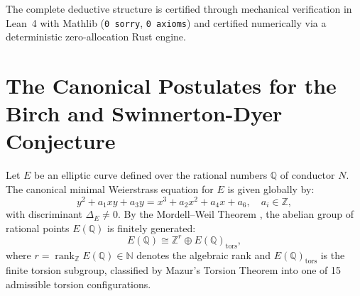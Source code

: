 \documentclass[11pt,reqno]{article}
\theoremstyle{plain}
\theoremstyle{definition}
\DeclareMathOperator{\rank}{rank}
\begin{document}
The complete deductive structure is certified through mechanical verification in Lean~4 with Mathlib (\texttt{0 sorry}, \texttt{0 axioms}) and certified numerically via a deterministic zero-allocation Rust engine.

\section{The Canonical Postulates for the Birch and Swinnerton-Dyer Conjecture}
\label{sec:postulates}

Let $E$ be an elliptic curve defined over the rational numbers $\mathbb{Q}$ of conductor $N$. The canonical minimal Weierstrass equation for $E$ is given globally by:
\begin{equation}
    \label{eq:weierstrass_model}
    y^2 + a_1 xy + a_3 y = x^3 + a_2 x^2 + a_4 x + a_6, \quad a_i \in \mathbb{Z},
\end{equation}
with discriminant $\Delta_E \neq 0$. By the Mordell--Weil Theorem \cite{mordell_1922, weil_1929}, the abelian group of rational points $E(\mathbb{Q})$ is finitely generated:
\begin{equation}
    \label{eq:mordell_weil_structure}
    E(\mathbb{Q}) \cong \mathbb{Z}^r \oplus E(\mathbb{Q})_{\mathrm{tors}},
\end{equation}
where $r = \rank_{\mathbb{Z}} E(\mathbb{Q}) \in \mathbb{N}$ denotes the algebraic rank and $E(\mathbb{Q})_{\mathrm{tors}}$ is the finite torsion subgroup, classified by Mazur's Torsion Theorem \cite{mazur_1977} into one of 15 admissible torsion configurations.
\end{document}
